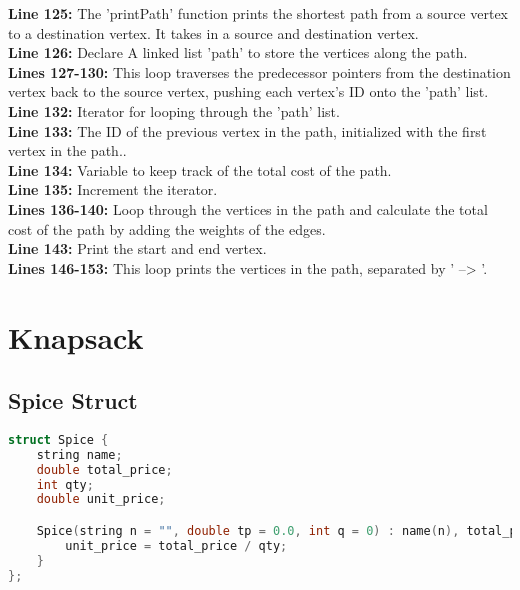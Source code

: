 \documentclass[letterpaper, 10pt,DIV=13]{scrartcl}
\numberwithin{equation}{section} %
\numberwithin{figure}{section} %
\numberwithin{table}{section} %
\begin{document}
\textbf{Line 125:} The 'printPath' function prints the shortest path from a source vertex to a destination vertex. It takes in a source and destination vertex. \\
\textbf{Line 126:} Declare A linked list 'path' to store the vertices along the path. \\
\textbf{Lines 127-130:} This loop traverses the predecessor pointers from the destination vertex back to the source vertex, pushing each vertex's ID onto the 'path' list. \\
\textbf{Line 132:} Iterator for looping through the 'path' list. \\
\textbf{Line 133:} The ID of the previous vertex in the path, initialized with the first vertex in the path.. \\
\textbf{Line 134:} Variable to keep track of the total cost of the path. \\
\textbf{Line 135:} Increment the iterator. \\
\textbf{Lines 136-140:}  Loop through the vertices in the path and calculate the total cost of the path by adding the weights of the edges.\\
\textbf{Line 143:} Print the start and end vertex. \\
\textbf{Lines 146-153:} This loop prints the vertices in the path, separated by ' --> '. \\


\pagebreak

\section{Knapsack}
\subsection{Spice Struct}
\begin{linenumbers}
\begin{lstlisting}[language=C++, caption={Spice Struct}, label={code:example}]
struct Spice {
    string name;
    double total_price;
    int qty;
    double unit_price;

    Spice(string n = "", double tp = 0.0, int q = 0) : name(n), total_price(tp), qty(q) {
        unit_price = total_price / qty;
    }
};
\end{lstlisting}
\end{linenumbers}
\nolinenumbers
\end{document}
